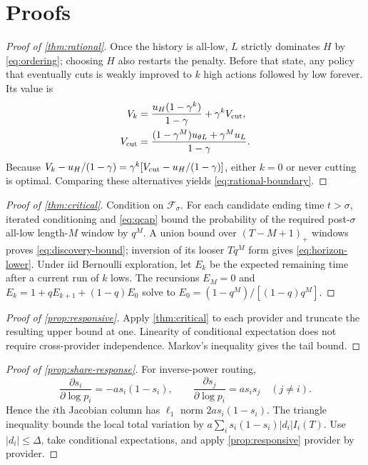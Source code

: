 \documentclass[10pt,twocolumn]{article}
\begin{document}
\appendix
\section{Proofs}

\begin{proof}[Proof of \cref{thm:rational}]
Once the history is all-low, $L$ strictly dominates $H$ by
\cref{eq:ordering}; choosing $H$ also restarts the penalty.  Before that state,
any policy that eventually cuts is weakly improved to $k$ high actions followed
by low forever.  Its value is
\begin{align*}
 V_k&=\frac{u_H(1-\gamma^k)}{1-\gamma}+\gamma^kV_{\rm cut},\\
 V_{\rm cut}&=\frac{(1-\gamma^M)u_{\theta L}+\gamma^Mu_L}{1-\gamma}.
\end{align*}
Because
$V_k-u_H/(1-\gamma)=\gamma^k[V_{\rm cut}-u_H/(1-\gamma)]$, either $k=0$
or never cutting is optimal.  Comparing these alternatives yields
\cref{eq:rational-boundary}.
\end{proof}

\begin{proof}[Proof of \cref{thm:critical}]
Condition on $\mathcal F_\sigma$.  For each candidate ending time
$t>\sigma$, iterated conditioning and \cref{eq:qcap} bound the probability
of the required post-$\sigma$ all-low length-$M$ window by $q^M$.  A union
bound over $(T-M+1)_+$ windows proves
\cref{eq:discovery-bound}; inversion of its looser $Tq^M$ form gives
\cref{eq:horizon-lower}.  Under iid Bernoulli exploration, let $E_k$ be the
expected remaining time after a current run of $k$ lows.  The recursions
$E_M=0$ and $E_k=1+qE_{k+1}+(1-q)E_0$ solve to
$E_0=(1-q^M)/[(1-q)q^M]$.
\end{proof}

\begin{proof}[Proof of \cref{prop:responsive}]
Apply \cref{thm:critical} to each provider and truncate the resulting upper
bound at one.  Linearity of conditional expectation does not require
cross-provider independence.  Markov's inequality gives the tail bound.
\end{proof}

\begin{proof}[Proof of \cref{prop:share-response}]
For inverse-power routing,
\[
 \frac{\partial s_i}{\partial\log p_i}=-a s_i(1-s_i),
 \qquad
 \frac{\partial s_j}{\partial\log p_i}=a s_i s_j\quad(j\ne i).
\]
Hence the $i$th Jacobian column has $\ell_1$ norm
$2a s_i(1-s_i)$.  The triangle inequality bounds the local total variation by
$a\sum_i s_i(1-s_i)|d_i|I_i(T)$.  Use $|d_i|\le\Delta$, take conditional
expectations, and apply \cref{prop:responsive} provider by provider.
\end{proof}
\end{document}
